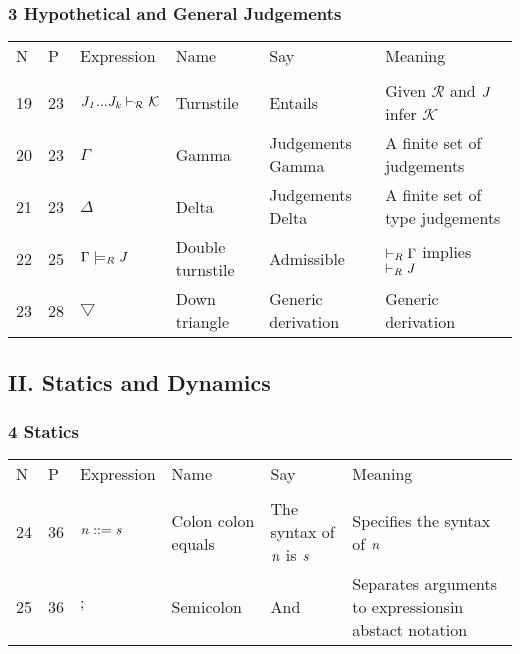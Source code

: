 \documentclass[12pt]{article}
\begin{document}
\subsubsection*{3 Hypothetical and General Judgements}
\begin{tabular}[b] {p{} p{} p{} p{} 
p{} p{}}
N & P & Expression & Name & Say & Meaning \\ \\
19& 23 & ${\it{J}_{1}...\it{J}_{\it{k}}} \vdash_{\mathcal{R}} \mathcal{K}$ & Turnstile & Entails & Given $\mathcal{R}$ and $\it{J}$ infer $\mathcal{K}$\\

20& 23 & $\Gamma$ & Gamma & Judgements Gamma & A finite set of judgements \\
21& 23 & $\Delta$ & Delta & Judgements Delta & A finite set of type judgements \\
22& 25 & $\Gamma \models_{\it{R}} \it{J}$ & Double turnstile & Admissible & $\vdash_{\it{R}} \Gamma$ implies $\vdash_{\it{R}} \it{J}$ \\
23& 28 & $\bigtriangledown$ & Down triangle & Generic derivation & Generic derivation \\
\end{tabular}

\subsection*{II. Statics and Dynamics}

\subsubsection*{4 Statics}
\begin{tabular}[b] {p{} p{} p{} p{} 
p{} p{}}
N & P & Expression & Name & Say & Meaning \\ \\


24& 36 & $ \it{n} ::= \it{s} $ & Colon colon equals & The syntax of $\it{n}$ is $\it{s}$ & Specifies the syntax of $\it{n}$ \\
25& 36 & $;$ & Semicolon & And & Separates arguments to expressionsin abstact notation\\

\end{tabular}
\end{document}
